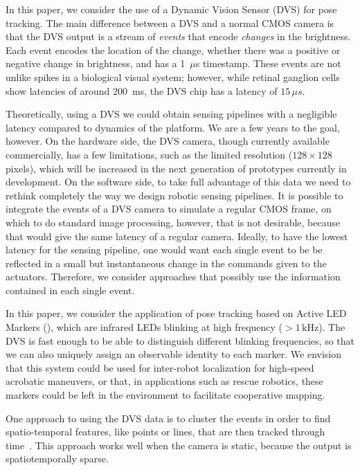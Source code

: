 In this paper, we consider the use of a Dynamic Vision Sensor (DVS)
for pose tracking. The main difference between a DVS and a normal
CMOS camera is that the DVS output is a stream of \emph{events} that
encode \emph{changes} in the brightness. Each event encodes the location
of the change, whether there was a positive or negative change in
brightness, and has a 1~$\mu$s timestamp.  These events are not
unlike spikes in a biological visual system; however, while retinal
ganglion cells show latencies of around 200~ms, the DVS chip has
a latency of $15\,\mu s$.

Theoretically, using a DVS we could obtain sensing pipelines with
a negligible latency compared to dynamics of the platform. We are
a few years to the goal, however. On the hardware side, the DVS camera,
though currently available commercially, has a few limitations, such
as the limited resolution ($128\times128$ pixels), which  will
be increased in the next generation of prototypes currently in development.
On the software side, to take full advantage of this data we need
to rethink completely the way we design robotic sensing pipelines.
It is possible to integrate the events of a DVS camera to simulate
a regular CMOS frame, on which to do standard image processing, however,
that is not desirable, because that would give the same latency of
a regular camera. Ideally, to have the lowest latency for the sensing
pipeline, one would want each single event to be be reflected in a
small but instantaneous change in the commands given to the actuators.
Therefore, we consider approaches that possibly use the information
contained in each single event.

In this paper, we consider the application of pose tracking based
on Active LED Markers (\ALMs), which are infrared LEDs blinking at
 high frequency ($>1\,\mbox{kHz}$). The DVS is fast enough to be
able to distinguish different blinking frequencies, so that we can
also uniquely assign an observable identity to each marker. We envision
that this system could be used for inter-robot localization for high-speed
acrobatic maneuvers, or that, in applications such as rescue robotics,
these markers could be left in the environment to facilitate cooperative
mapping.

One approach to using the DVS data is to cluster the events in order
to find spatio-temporal features, like points or lines, that are then
tracked through time~\cite{delbruck07fast,conradt09pencil,Matthias}.
This approach works well when the camera is static, because the output
is spatiotemporally sparse. 

